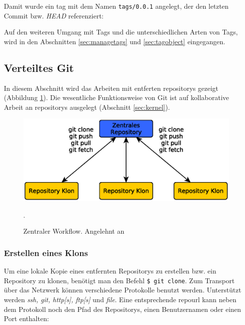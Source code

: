 
Damit wurde ein \gls{tag} mit dem Namen \texttt{tags/0.0.1} angelegt,
der den letzten Commit bzw. \textit{\gls{HEAD}} referenziert:


Auf den weiteren Umgang mit Tags und die unterschiedlichen Arten von Tags, wird
in den Abschnitten \ref{sec:managetags} und \ref{sec:tagobject} eingegangen.

\subsection{Verteiltes Git}\label{sec:distributed}
In diesem Abschnitt wird das Arbeiten mit entferten \glspl{repository}
gezeigt (Abbildung \ref{fig:centralworkflow}). Die wesentliche Funktionsweise
von Git ist auf kollaborative Arbeit an \glspl{repository} ausgelegt (Abschnitt
\ref{sec:kernel}).

\begin{figure}[h]
  \centering
  \includegraphics[scale=0.70]{images/workflow.eps}
  \caption{Zentraler Workflow. Angelehnt an \cite[S.~138]{gitosp}}.
  \label{fig:centralworkflow}
\end{figure}

\subsubsection{Erstellen eines Klons}\label{sec:gitclone}
Um eine lokale Kopie eines entfernten Repositorys zu erstellen bzw. ein
Repository zu klonen, benötigt man den Befehl \texttt{\$ git clone}. Zum
Transport über das Netzwerk können verschiedene Protokolle benutzt werden.
Unterstützt werden \textit{ssh, git, http[s], ftp[s]} und \textit{file}. Eine
entsprechende \gls{repourl} kann neben dem Protokoll noch den Pfad des
Repositorys, einen Benutzernamen oder einen Port enthalten:

